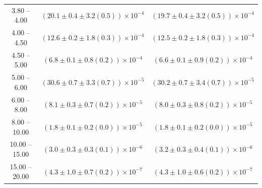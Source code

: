 \begin{table}
\begin{center}
\begin{tabular}{ c | c c }
3.80 -- 4.00 & $(20.1\pm0.4\pm3.2(0.5))\times10^{-4}$ & $(19.7\pm0.4\pm3.2(0.5))\times10^{-4}$ \\ 
4.00 -- 4.50 & $(12.6\pm0.2\pm1.8(0.3))\times10^{-4}$ & $(12.5\pm0.2\pm1.8(0.3))\times10^{-4}$ \\ 
4.50 -- 5.00 & $(6.8\pm0.1\pm0.8(0.2))\times10^{-4}$ & $(6.6\pm0.1\pm0.9(0.2))\times10^{-4}$ \\ 
5.00 -- 6.00 & $(30.6\pm0.7\pm3.3(0.7))\times10^{-5}$ & $(30.2\pm0.7\pm3.4(0.7))\times10^{-5}$ \\ 
6.00 -- 8.00 & $(8.1\pm0.3\pm0.7(0.2))\times10^{-5}$ & $(8.0\pm0.3\pm0.8(0.2))\times10^{-5}$ \\ 
8.00 -- 10.00 & $(1.8\pm0.1\pm0.2(0.0))\times10^{-5}$ & $(1.8\pm0.1\pm0.2(0.0))\times10^{-5}$ \\ 
10.00 -- 15.00 & $(3.0\pm0.3\pm0.3(0.1))\times10^{-6}$ & $(3.2\pm0.3\pm0.4(0.1))\times10^{-6}$ \\ 
15.00 -- 20.00 & $(4.3\pm1.0\pm0.7(0.2))\times10^{-7}$ & $(4.3\pm1.0\pm0.6(0.2))\times10^{-7}$ \\ 
\hline
\end{tabular}
\end{center}
\end{table}
 

